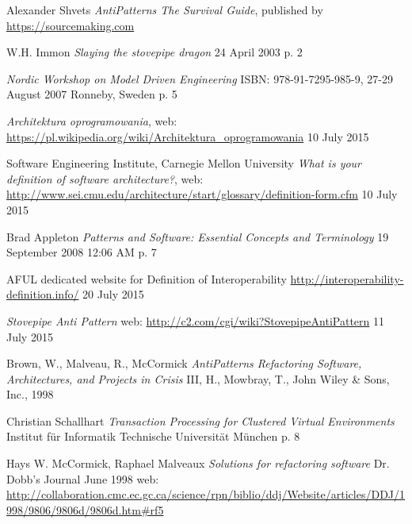 \begin{thebibliography}{9}
     
    Alexander Shvets
    \emph{AntiPatterns The Survival Guide},
    published by \url{https://sourcemaking.com}
    
    W.H. Immon
    \emph{Slaying the stovepipe dragon}
    24 April 2003
    p. 2
    
    \emph{Nordic Workshop on Model Driven Engineering}
    ISBN: 978-91-7295-985-9,
    27-29 August 2007 Ronneby, Sweden
    p. 5
    
    \emph{Architektura oprogramowania},
    web: \url{https://pl.wikipedia.org/wiki/Architektura_oprogramowania}
    10 July 2015
    
    Software Engineering Institute, Carnegie Mellon University
    \emph{What is your definition of software architecture?},
    web: \url{http://www.sei.cmu.edu/architecture/start/glossary/definition-form.cfm}
    10 July 2015
    
     Brad Appleton
     \emph{Patterns and Software: Essential Concepts and Terminology}
     19 September 2008 12:06 AM
     p. 7
     
    AFUL dedicated website for Definition of Interoperability
    \url{http://interoperability-definition.info/}
    20 July 2015
     
    \emph{Stovepipe Anti Pattern}
    web: \url{http://c2.com/cgi/wiki?StovepipeAntiPattern}
    11 July 2015
    
    Brown, W., Malveau, R., McCormick
    \emph{AntiPatterns Refactoring Software, Architectures, and Projects in Crisis}
    III, H., Mowbray, T., John Wiley \& Sons, Inc., 1998
    
    Christian Schallhart
    \emph{Transaction Processing for Clustered Virtual Environments}
    Institut für Informatik
    Technische Universität München
    p. 8
    
    Hays W. McCormick, Raphael Malveaux
    \emph{Solutions for refactoring software}
    Dr. Dobb's Journal June 1998
    web: \url{http://collaboration.cmc.ec.gc.ca/science/rpn/biblio/ddj/Website/articles/DDJ/1998/9806/9806d/9806d.htm#rf5}

\end{thebibliography}